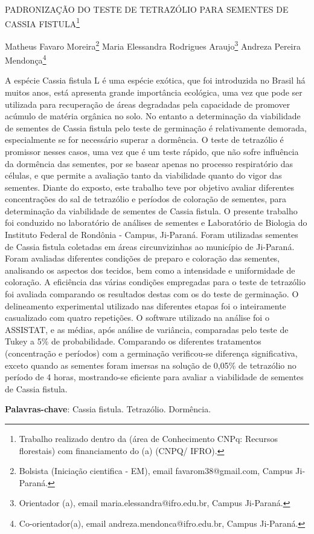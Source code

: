 \documentclass[article,12pt,onesidea,4paper,english,brazil]{abntex2}
\begin{document}
	
	
	\frenchspacing 
	
	\begin{center}
		\LARGE PADRONIZAÇÃO DO TESTE DE TETRAZÓLIO PARA SEMENTES DE CASSIA FISTULA\footnote{Trabalho realizado dentro da (área de Conhecimento CNPq: Recursos florestais) com financiamento do (a) (CNPQ/ IFRO).}
		
		\normalsize
		Matheus Favaro Moreira\footnote{Bolsista (Iniciação cientifica - EM), email favarom38@gmail.com, Campus Ji-Paraná.} 
		Maria Elessandra Rodrigues Araujo\footnote{Orientador (a), email maria.elessandra@ifro.edu.br, Campus Ji-Paraná.} 
		Andreza Pereira Mendonça\footnote{Co-orientador(a), email andreza.mendonca@ifro.edu.br, Campus Ji-Paraná.}  
	\end{center}
	
	\noindent A espécie Cassia fistula L é uma espécie exótica, que foi introduzida no Brasil há muitos anos, está apresenta grande importância ecológica, uma vez que pode ser utilizada para recuperação de áreas degradadas pela capacidade de promover acúmulo de matéria orgânica no solo. No entanto a determinação da viabilidade de sementes de Cassia fistula pelo teste de germinação é relativamente demorada, especialmente se for necessário superar a dormência. O teste de tetrazólio é promissor nesses casos, uma vez que é um teste rápido, que não sofre influência da dormência das sementes, por se basear apenas no processo respiratório das células, e que permite a avaliação tanto da viabilidade quanto do vigor das sementes. Diante do exposto, este trabalho teve por objetivo avaliar diferentes concentrações do sal de tetrazólio e períodos de coloração de sementes, para determinação da viabilidade de sementes de Cassia fistula. O presente trabalho foi conduzido no laboratório de análises de sementes e Laboratório de Biologia do Instituto Federal de Rondônia - Campus, Ji-Paraná. Foram utilizadas sementes de Cassia fistula coletadas em áreas circunvizinhas ao município de Ji-Paraná. Foram avaliadas diferentes condições de preparo e coloração das sementes, analisando os aspectos dos tecidos, bem como a intensidade e uniformidade de coloração. A eficiência das várias condições empregadas para o teste de tetrazólio foi avaliada comparando os resultados destas com os do teste de germinação. O delineamento experimental utilizado nas diferentes etapas foi o inteiramente casualizado com quatro repetições. O software utilizado na análise foi o ASSISTAT, e as médias, após análise de variância, comparadas pelo teste de Tukey a 5\% de probabilidade. Comparando os diferentes tratamentos (concentração e períodos) com a germinação verificou-se diferença significativa, exceto quando as sementes foram imersas na solução de 0,05\% de tetrazólio no período de 4 horas, mostrando-se eficiente para avaliar a viabilidade de sementes de Cassia fistula.
	
	\vspace{\onelineskip}
	
	\noindent
	\textbf{Palavras-chave}: Cassia fistula. Tetrazólio. Dormência.
	
\end{document}
